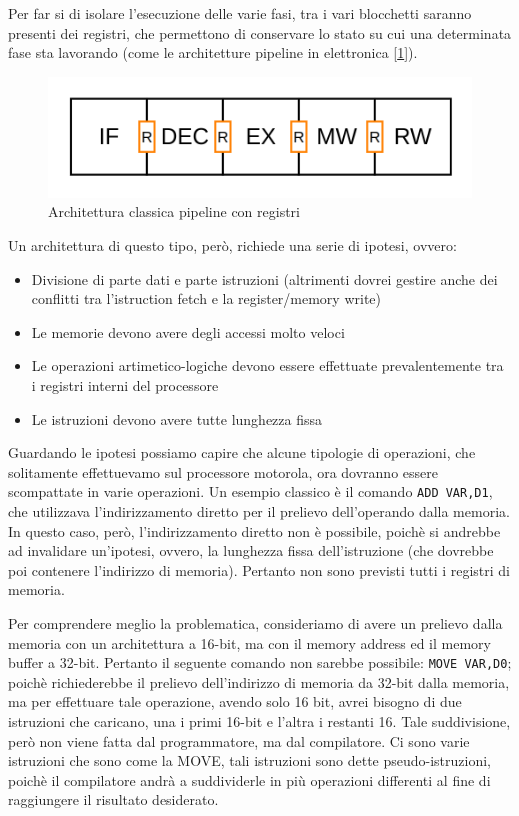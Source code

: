 Per far si di isolare l'esecuzione delle varie fasi, tra i vari blocchetti saranno presenti dei registri, che permettono di conservare lo stato su cui una determinata fase sta lavorando (come le architetture pipeline in elettronica [\ref{img:pipe-reg}]). 

\begin{figure}
    \centering
    \includegraphics[width=.5\textwidth]{img/Pipe-reg.png}
    \caption{Architettura classica pipeline con registri}\label{img:pipe-reg}
\end{figure}

Un architettura di questo tipo, però, richiede una serie di ipotesi, ovvero:
\begin{itemize}
    \item Divisione di parte dati e parte istruzioni (altrimenti dovrei gestire anche dei conflitti tra l'istruction fetch e la register/memory write)
    \item Le memorie devono avere degli accessi molto veloci
    \item Le operazioni artimetico-logiche devono essere effettuate prevalentemente tra i registri interni del processore
    \item Le istruzioni devono avere tutte lunghezza fissa
\end{itemize}

Guardando le ipotesi possiamo capire che alcune tipologie di operazioni, che solitamente effettuevamo sul processore motorola, ora dovranno essere scompattate in varie operazioni. Un esempio classico è il comando \lstinline|ADD VAR,D1|, che utilizzava l'indirizzamento diretto per il prelievo dell'operando dalla memoria. In questo caso, però, l'indirizzamento diretto non è possibile, poichè si andrebbe ad invalidare un'ipotesi, ovvero, la lunghezza fissa dell'istruzione (che dovrebbe poi contenere l'indirizzo di memoria). Pertanto non sono previsti tutti i registri di memoria.

Per comprendere meglio la problematica, consideriamo di avere un prelievo dalla memoria con un architettura a 16-bit, ma con il memory address ed il memory buffer a 32-bit. Pertanto il seguente comando non sarebbe possibile: \lstinline|MOVE VAR,D0|; poichè richiederebbe il prelievo dell'indirizzo di memoria da 32-bit dalla memoria, ma per effettuare tale operazione, avendo solo 16 bit, avrei bisogno di due istruzioni che caricano, una i primi 16-bit e l'altra i restanti 16. Tale suddivisione, però non viene fatta dal programmatore, ma dal compilatore. Ci sono varie istruzioni che sono come la MOVE, tali istruzioni sono dette pseudo-istruzioni, poichè il compilatore andrà a suddividerle in più operazioni differenti al fine di raggiungere il risultato desiderato.


